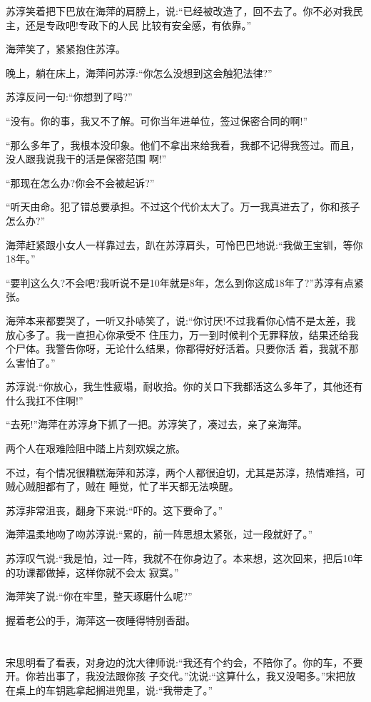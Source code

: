 \documentclass[11pt,a4paper,onecolumn]{article}
\begin{document}
苏淳笑着把下巴放在海萍的肩膀上，说:``已经被改造了，回不去了。你不必对我民主，还是专政吧!专政下的人民
比较有安全感，有依靠。''

海萍笑了，紧紧抱住苏淳。

晚上，躺在床上，海萍问苏淳:``你怎么没想到这会触犯法律?''

苏淳反问一句:``你想到了吗?''

``没有。你的事，我又不了解。可你当年进单位，签过保密合同的啊!''

``那么多年了，我根本没印象。他们不拿出来给我看，我都不记得我签过。而且，没人跟我说我干的活是保密范围
啊!''

``那现在怎么办?你会不会被起诉?''

``听天由命。犯了错总要承担。不过这个代价太大了。万一我真进去了，你和孩子怎么办?''

海萍赶紧跟小女人一样靠过去，趴在苏淳肩头，可怜巴巴地说:``我做王宝钏，等你18年。''

``要判这么久?不会吧?我听说不是10年就是8年，怎么到你这成18年了?''苏淳有点紧张。

海萍本来都要哭了，一听又扑哧笑了，说:``你讨厌!不过我看你心情不是太差，我放心多了。我一直担心你承受不
住压力，万一到时候判个无罪释放，结果还给我个尸体。我警告你呀，无论什么结果，你都得好好活着。只要你活
着，我就不那么害怕了。''

苏淳说:``你放心，我生性疲塌，耐收拾。你的关口下我都活这么多年了，其他还有什么我扛不住啊!''

``去死!''海萍在苏淳身下抓了一把。苏淳笑了，凑过去，亲了亲海萍。

两个人在艰难险阻中踏上片刻欢娱之旅。

不过，有个情况很糟糕\myrule 海萍和苏淳，两个人都很迫切，尤其是苏淳，热情难挡，可贼心贼胆都有了，贼在
睡觉，忙了半天都无法唤醒。

苏淳非常沮丧，翻身下来说:``吓的。这下要命了。''

海萍温柔地吻了吻苏淳说:``累的，前一阵思想太紧张，过一段就好了。''

苏淳叹气说:``我是怕，过一阵，我就不在你身边了。本来想，这次回来，把后10年的功课都做掉，这样你就不会太
寂寞。''

海萍笑了说:``你在牢里，整天琢磨什么呢?''

握着老公的手，海萍这一夜睡得特别香甜。

\section[\thesection]{}

宋思明看了看表，对身边的沈大律师说:``我还有个约会，不陪你了。你的车，不要开。你若出事了，我没法跟你孩
子交代。''沈说:``这算什么，我又没喝多。''宋把放在桌上的车钥匙拿起搁进兜里，说:``我带走了。''
\end{document}
